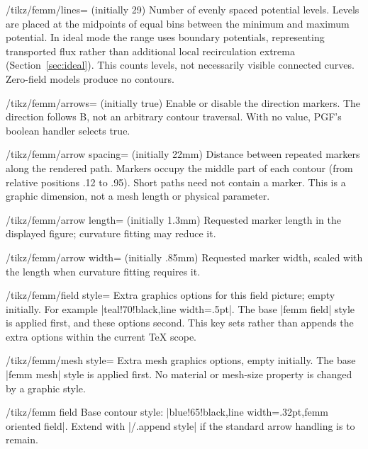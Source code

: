 \begin{key}{/tikz/femm/lines= (initially 29)}
Number of evenly spaced potential levels. Levels are placed at the
midpoints of equal bins between the minimum and maximum potential.
In ideal mode the range uses boundary potentials, representing transported
flux rather than additional local recirculation extrema (Section~\ref{sec:ideal}).
This counts levels, not necessarily visible connected curves. Zero-field
models produce no contours.
\end{key}
\begin{key}{/tikz/femm/arrows= (initially true)}
Enable or disable the direction markers. The direction follows B, not an
arbitrary contour traversal. With no value, PGF's boolean handler selects true.
\end{key}
\begin{key}{/tikz/femm/arrow spacing= (initially 22mm)}
Distance between repeated markers along the rendered path. Markers occupy
the middle part of each contour (from relative positions .12 to .95).
Short paths need not contain a marker. This is a graphic dimension, not
a mesh length or physical parameter.
\end{key}
\begin{key}{/tikz/femm/arrow length= (initially 1.3mm)}
Requested marker length in the displayed figure; curvature fitting may reduce it.
\end{key}
\begin{key}{/tikz/femm/arrow width= (initially .85mm)}
Requested marker width, scaled with the length when curvature fitting requires it.
\end{key}
\begin{key}{/tikz/femm/field style=}
Extra graphics options for this field picture; empty initially. For
example |{teal!70!black,line width=.5pt}|. The base |femm field| style is
applied first, and these options second. This key sets rather than appends
the extra options within the current TeX scope.
\end{key}
\begin{key}{/tikz/femm/mesh style=}
Extra mesh graphics options, empty initially. The base |femm mesh| style
is applied first. No material or mesh-size property is changed by a
graphic style.
\end{key}
\begin{stylekey}{/tikz/femm field}
Base contour style: |blue!65!black,line width=.32pt,femm oriented field|.
Extend with |/.append style| if the standard arrow handling is to remain.
\end{stylekey}
